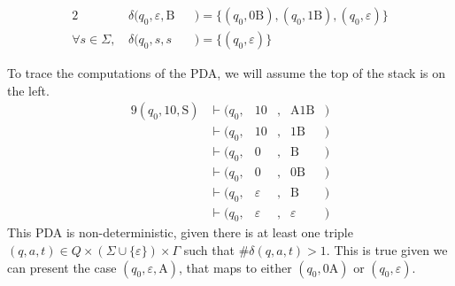 \documentclass[docid=PA08]{tcom_PA}
\begin{document}
{\begin{center}
\begin{minipage}[c]{0.5\textwidth}
\begin{alignat*}{2}
		&\delta(q_0, \varepsilon, \text{B}&&) = \{(q_0, \text{0B} ), (q_0, \text{1B}), (q_0,\varepsilon)\}\\
		\forall s \in \Sigma ,\, &\delta(q_0,s,s&&) = \{(q_0,\varepsilon)\}
	\end{alignat*}
\end{minipage}%
\end{center}
To trace the computations of the PDA, we will assume the top of the stack is on the left.
\begin{alignat*}{9}
	(q_0, \text{10}, \text{S})
	&\vdash (q_0, &\text{10}   &, &\text{A1B}  &)\\
	&\vdash (q_0, &\text{10}   &, &\text{1B}   &)\\
	&\vdash (q_0, &\text{0}    &, &\text{B}    &)\\
	&\vdash (q_0, &\text{0}    &, &\text{0B}   &)\\
	&\vdash (q_0, &\varepsilon &, &\text{B}    &)\\
	&\vdash (q_0, &\varepsilon &, &\varepsilon &)
\end{alignat*}
This PDA is non-deterministic, given there is at least one triple $(q,a,t) \in Q \times (\Sigma \cup \{\varepsilon\} ) \times \Gamma $ such that $\#\delta(q,a,t) > 1$. This is true given we can present the case $(q_0,\varepsilon,\text{A})$, that maps to either $(q_0,\text{0A})$ or $(q_0,\varepsilon)$.
}
\end{document}
